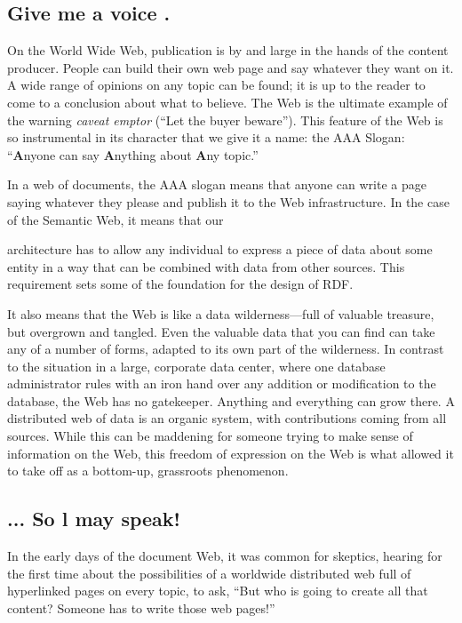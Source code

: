 \subsection{Give me a voice .}

On the World Wide Web, publication is by and large in the hands of the
content producer. People can build their own web page and say whatever
they want on it. A wide range of opinions on any topic can be found; it
is up to the reader to come to a conclusion about what to believe. The
Web is the ultimate example of the warning \emph{caveat emptor} (``Let
the buyer beware''). This feature of the Web is so instrumental in its
character that we give it a name: the AAA Slogan: ``\textbf{A}nyone can
say \textbf{A}nything about \textbf{A}ny topic.''

In a web of documents, the AAA slogan means that anyone can write a page
saying whatever they please and publish it to the Web infrastructure. In
the case of the Semantic Web, it means that our

architecture has to allow any individual to express a piece of data
about some entity in a way that can be combined with data from other
sources. This requirement sets some of the foundation for the design of
RDF.

It also means that the Web is like a data wilderness---full of valuable
treasure, but overgrown and tangled. Even the valuable data that you can
find can take any of a number of forms, adapted to its own part of the
wilderness. In contrast to the situation in a large, corporate data
center, where one database administrator rules with an iron hand over
any addition or modification to the database, the Web has no gatekeeper.
Anything and everything can grow there. A distributed web of data is an
organic system, with contributions coming from all sources. While this
can be maddening for someone trying to make sense of information on the
Web, this freedom of expression on the Web is what allowed it to take
off as a bottom-up, grassroots phenomenon.

\subsection{... So l may speak!}

In the early days of the document Web, it was common for skeptics,
hearing for the first time about the possibilities of a worldwide
distributed web full of hyperlinked pages on every topic, to ask, ``But
who is going to create all that content? Someone has to write those web
pages!''

